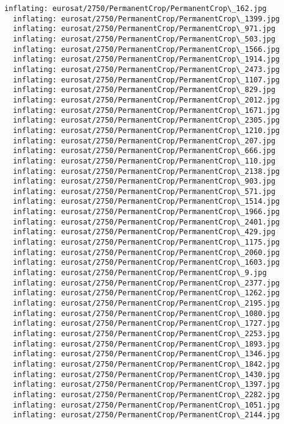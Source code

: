 \documentclass[11pt]{article}
\begin{document}
\begin{Verbatim}[commandchars=\\\{\}]
  inflating: eurosat/2750/PermanentCrop/PermanentCrop\_162.jpg
  inflating: eurosat/2750/PermanentCrop/PermanentCrop\_1399.jpg
  inflating: eurosat/2750/PermanentCrop/PermanentCrop\_971.jpg
  inflating: eurosat/2750/PermanentCrop/PermanentCrop\_503.jpg
  inflating: eurosat/2750/PermanentCrop/PermanentCrop\_1566.jpg
  inflating: eurosat/2750/PermanentCrop/PermanentCrop\_1914.jpg
  inflating: eurosat/2750/PermanentCrop/PermanentCrop\_2473.jpg
  inflating: eurosat/2750/PermanentCrop/PermanentCrop\_1107.jpg
  inflating: eurosat/2750/PermanentCrop/PermanentCrop\_829.jpg
  inflating: eurosat/2750/PermanentCrop/PermanentCrop\_2012.jpg
  inflating: eurosat/2750/PermanentCrop/PermanentCrop\_1671.jpg
  inflating: eurosat/2750/PermanentCrop/PermanentCrop\_2305.jpg
  inflating: eurosat/2750/PermanentCrop/PermanentCrop\_1210.jpg
  inflating: eurosat/2750/PermanentCrop/PermanentCrop\_207.jpg
  inflating: eurosat/2750/PermanentCrop/PermanentCrop\_666.jpg
  inflating: eurosat/2750/PermanentCrop/PermanentCrop\_110.jpg
  inflating: eurosat/2750/PermanentCrop/PermanentCrop\_2138.jpg
  inflating: eurosat/2750/PermanentCrop/PermanentCrop\_903.jpg
  inflating: eurosat/2750/PermanentCrop/PermanentCrop\_571.jpg
  inflating: eurosat/2750/PermanentCrop/PermanentCrop\_1514.jpg
  inflating: eurosat/2750/PermanentCrop/PermanentCrop\_1966.jpg
  inflating: eurosat/2750/PermanentCrop/PermanentCrop\_2401.jpg
  inflating: eurosat/2750/PermanentCrop/PermanentCrop\_429.jpg
  inflating: eurosat/2750/PermanentCrop/PermanentCrop\_1175.jpg
  inflating: eurosat/2750/PermanentCrop/PermanentCrop\_2060.jpg
  inflating: eurosat/2750/PermanentCrop/PermanentCrop\_1603.jpg
  inflating: eurosat/2750/PermanentCrop/PermanentCrop\_9.jpg
  inflating: eurosat/2750/PermanentCrop/PermanentCrop\_2377.jpg
  inflating: eurosat/2750/PermanentCrop/PermanentCrop\_1262.jpg
  inflating: eurosat/2750/PermanentCrop/PermanentCrop\_2195.jpg
  inflating: eurosat/2750/PermanentCrop/PermanentCrop\_1080.jpg
  inflating: eurosat/2750/PermanentCrop/PermanentCrop\_1727.jpg
  inflating: eurosat/2750/PermanentCrop/PermanentCrop\_2253.jpg
  inflating: eurosat/2750/PermanentCrop/PermanentCrop\_1893.jpg
  inflating: eurosat/2750/PermanentCrop/PermanentCrop\_1346.jpg
  inflating: eurosat/2750/PermanentCrop/PermanentCrop\_1842.jpg
  inflating: eurosat/2750/PermanentCrop/PermanentCrop\_1430.jpg
  inflating: eurosat/2750/PermanentCrop/PermanentCrop\_1397.jpg
  inflating: eurosat/2750/PermanentCrop/PermanentCrop\_2282.jpg
  inflating: eurosat/2750/PermanentCrop/PermanentCrop\_1051.jpg
  inflating: eurosat/2750/PermanentCrop/PermanentCrop\_2144.jpg

\end{Verbatim}
\end{document}
